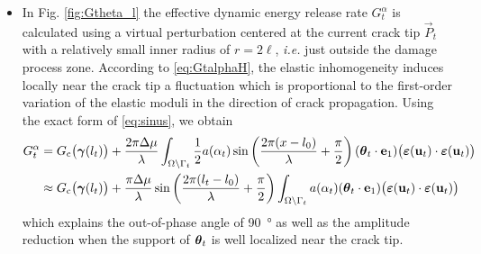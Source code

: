 \begin{itemize}
\item In Fig. \ref{fig:Gtheta_l} the effective dynamic energy release rate $G^\alpha_t$ is calculated using a virtual perturbation centered at the current crack tip $\vec{P}_t$ with a relatively small inner radius of $r=2\ell$, \emph{i.e.} just outside the damage process zone. According to \eqref{eq:GtalphaH}, the elastic inhomogeneity induces locally near the crack tip a fluctuation which is proportional to the first-order variation of the elastic moduli in the direction of crack propagation. Using the exact form of \eqref{eq:sinus}, we obtain
\begin{align*}
G_t^\alpha &= \gc\bigl(\vec{\gamma}(l_t)\bigr)+\frac{2\pi\Delta\mu}{\lambda}\int_\domaint\frac{1}{2}a(\alpha_t)\sin\left(\frac{2\pi(x-l_0)}{\lambda}+\frac{\pi}{2}\right)(\vtheta_t\cdot\vec{e}_1)\bigl(\eps(\vec{u}_t)\cdot\eps(\vec{u}_t)\bigr) \\
&\approx \gc\bigl(\vec{\gamma}(l_t)\bigr)+\frac{\pi\Delta\mu}{\lambda}\sin\left(\frac{2\pi(l_t-l_0)}{\lambda}+\frac{\pi}{2}\right)\int_\domaint a(\alpha_t)(\vtheta_t\cdot\vec{e}_1)\bigl(\eps(\vec{u}_t)\cdot\eps(\vec{u}_t)\bigr)
\end{align*}
which explains the out-of-phase angle of \SI{90}{\degree} as well as the amplitude reduction when the support of $\vtheta_t$ is well localized near the crack tip.


\end{itemize}
